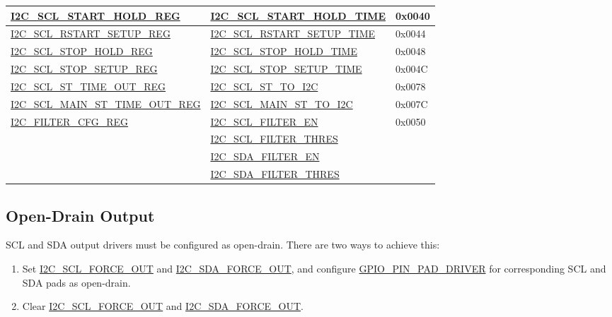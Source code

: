 \documentclass[main\_\_EN.tex]{subfiles}
\begin{document}
\begin{longtable}{ | p{6cm} | p{7cm} | p{2cm} | }
\hyperref[regdesc:I2CSCLSTARTHOLDREG]{I2C\_SCL\_START\_HOLD\_REG} & \hyperref[fielddesc:I2CSCLSTARTHOLDTIME]{I2C\_SCL\_START\_HOLD\_TIME} & 0x0040  \\ \hline
\hyperref[regdesc:I2CSCLRSTARTSETUPREG]{I2C\_SCL\_RSTART\_SETUP\_REG} & \hyperref[fielddesc:I2CSCLRSTARTSETUPTIME]{I2C\_SCL\_RSTART\_SETUP\_TIME} & 0x0044  \\ \hline

\hyperref[regdesc:I2CSCLSTOPHOLDREG]{I2C\_SCL\_STOP\_HOLD\_REG} & \hyperref[fielddesc:I2CSCLSTOPHOLDTIME]{I2C\_SCL\_STOP\_HOLD\_TIME} & 0x0048  \\ \hline
\hyperref[regdesc:I2CSCLSTOPSETUPREG]{I2C\_SCL\_STOP\_SETUP\_REG} & \hyperref[fielddesc:I2CSCLSTOPSETUPTIME]{I2C\_SCL\_STOP\_SETUP\_TIME} & 0x004C  \\ \hline

\hyperref[regdesc:I2CSCLSTTIMEOUTREG]{I2C\_SCL\_ST\_TIME\_OUT\_REG}& \hyperref[fielddesc:I2CSCLSTTOI2C]{I2C\_SCL\_ST\_TO\_I2C} & 0x0078\\ \hline
\hyperref[regdesc:I2CSCLMAINSTTIMEOUTREG]{I2C\_SCL\_MAIN\_ST\_TIME\_OUT\_REG}& \hyperref[fielddesc:I2CSCLMAINSTTOI2C]{I2C\_SCL\_MAIN\_ST\_TO\_I2C} & 0x007C\\ \hline

\hyperref[regdesc:I2CFILTERCFGREG]{I2C\_FILTER\_CFG\_REG} & {\hyperref[fielddesc:I2CSCLFILTEREN]{I2C\_SCL\_FILTER\_EN}} & 0x0050  \\\cline{2-2}
& {\hyperref[fielddesc:I2CSCLFILTERTHRES]{I2C\_SCL\_FILTER\_THRES}}& \\\cline{2-2}
& {\hyperref[fielddesc:I2CSDAFILTEREN]{I2C\_SDA\_FILTER\_EN}} &  \\\cline{2-2}
& {\hyperref[fielddesc:I2CSDAFILTERTHRES]{I2C\_SDA\_FILTER\_THRES}} & \\ \hline
\end{longtable}

\subsection{Open-Drain Output}
SCL and SDA output drivers must be configured as open-drain. There are two ways to achieve this:
\begin{enumerate}
\item Set \hyperref[fielddesc:I2CSCLFORCEOUT]{I2C\_SCL\_FORCE\_OUT} and \hyperref[fielddesc:I2CSDAFORCEOUT]{I2C\_SDA\_FORCE\_OUT}, and configure \hyperref[fielddesc:GPIOPINNPADDRIVER]{GPIO\_PIN\_PAD\_DRIVER} for corresponding SCL and SDA pads as open-drain.
\item Clear \hyperref[fielddesc:I2CSCLFORCEOUT]{I2C\_SCL\_FORCE\_OUT} and \hyperref[fielddesc:I2CSDAFORCEOUT]{I2C\_SDA\_FORCE\_OUT}.
\end{enumerate}
\end{document}
